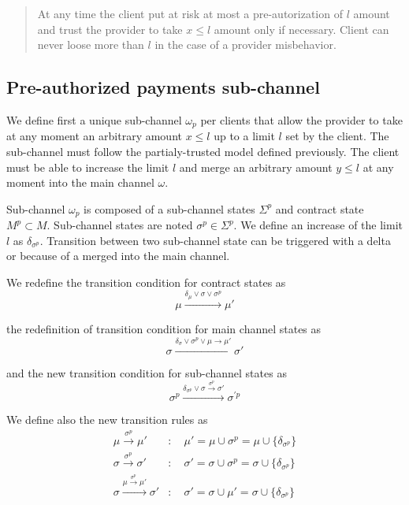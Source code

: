 \documentclass{llncs}
\begin{document}
\begin{quote}
    At any time the client put at risk at most a pre-autorization of $l$ amount and trust the provider to take $x \leq l$ amount only if necessary. Client can never loose more than $l$ in the case of a provider misbehavior.
\end{quote}

\subsection{Pre-authorized payments sub-channel} We define first a unique sub-channel $\omega_p$ per clients that allow the provider to take at any moment an arbitrary amount $x \leq l$ up to a limit $l$ set by the client. The sub-channel must follow the partialy-trusted model defined previously. The client must be able to increase the limit $l$ and merge an arbitrary amount $y \leq l$ at any moment into the main channel $\omega$.


Sub-channel $\omega_p$ is composed of a sub-channel states $\Sigma^p$ and contract state $M^p \subset M$. Sub-channel states are noted $\sigma^p \in \Sigma^p$. We define an increase of the limit $l$ as $\delta_{\sigma^p}$. Transition between two sub-channel state can be triggered with a delta or because of a merged into the main channel.

We redefine the transition condition for contract states as
$$\mu \xrightarrow{\delta_\mu \lor \sigma \lor \sigma^p} \mu'$$

the redefinition of transition condition for main channel states as
$$\sigma \xrightarrow{\delta_\sigma \lor \sigma^p \lor \mu \rightarrow \mu'} \sigma'$$

and the new transition condition for sub-channel states as
$$\sigma^p \xrightarrow{\delta_{\sigma^p} \lor \sigma \xrightarrow{\sigma^p} \sigma'} \sigma^{\prime p}$$

We define also the new transition rules as
\begin{equation*}
\begin{split}
    \mu \xrightarrow{\sigma^p} \mu' &: \quad \mu' = \mu \cup \sigma^p = \mu \cup \{ \delta_{\sigma^p} \} \\
    \sigma \xrightarrow{\sigma^p} \sigma' &: \quad \sigma' = \sigma \cup \sigma^p = \sigma \cup \{ \delta_{\sigma^p} \} \\
    \sigma \xrightarrow{\mu \xrightarrow{\sigma^p} \mu'} \sigma' &: \quad \sigma' =  \sigma \cup \mu' = \sigma \cup \{ \delta_{\sigma^p} \} \\
\end{split}
\end{equation*}
\end{document}
